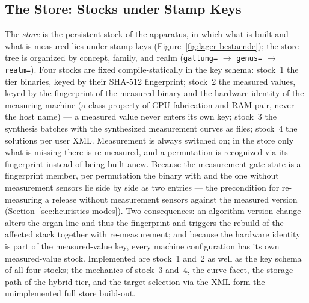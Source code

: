 \begin{nurkurz}
\subsection{The Store: Stocks under Stamp Keys}\label{sec:lager}
The \emph{store} is the persistent stock of the apparatus, in which what is built and what is measured
lies under stamp keys (Figure~\ref{fig:lager-bestaende}); the store tree is organized by concept, family,
and realm (\texttt{gattung=} $\to$ \texttt{genus=} $\to$ \texttt{realm=}). Four stocks are fixed
compile-statically in the key schema: stock~1 the tier binaries, keyed by their SHA-512 fingerprint;
stock~2 the measured values, keyed by the fingerprint of the measured binary and the hardware identity
of the measuring machine (a class property of CPU fabrication and RAM pair, never the host name) --- a
measured value never enters its own key; stock~3 the synthesis batches with the synthesized measurement
curves as files; stock~4 the solutions per user XML\@. Measurement is always switched on; in the store
only what is missing there is re-measured, and a permutation is recognized via its fingerprint instead
of being built anew. Because the measurement-gate state is a fingerprint member, per permutation the
binary with and the one without measurement sensors lie side by side as two entries --- the
precondition for re-measuring a release without measurement sensors against the measured version
(Section~\ref{sec:heuristics-modes}). Two consequences: an algorithm version change alters the organ
line and thus the fingerprint and triggers the rebuild of the affected stack together with
re-measurement; and because the hardware identity is part of the measured-value key, every machine
configuration has its own measured-value stock. Implemented are stock~1 and~2 as well as the key schema
of all four stocks; the mechanics of stock~3 and~4, the curve facet, the storage path of the hybrid
tier, and the target selection via the XML form the unimplemented full store build-out.
\begin{figure}[htbp]\centering
{}
\end{figure}
\end{nurkurz}
